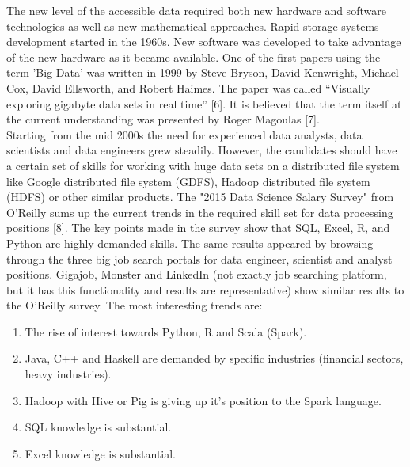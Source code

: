 \documentclass[
  twoside,
  11pt, a4paper,
  footinclude=true,
  headinclude=true,
  cleardoublepage=empty
]{scrreprt}
\begin{document}
        The new level of the accessible data required both new hardware and software technologies as well as new mathematical approaches. Rapid storage systems development started in the 1960s. New software was developed to take advantage of the new hardware as it became available. One of the first papers using the term 'Big Data' was written in 1999 by Steve Bryson, David Kenwright, Michael Cox, David Ellsworth, and Robert Haimes. The paper was called “Visually exploring gigabyte data sets in real time” [6]. It is believed that the term itself at the current understanding was presented by Roger Magoulas [7].\\
        Starting from the mid 2000s the need for experienced data analysts, data scientists and data engineers grew steadily. However, the candidates should have a certain set of skills for working with huge data sets on a distributed file system like Google distributed file system (GDFS), Hadoop distributed file system (HDFS) or other similar products. The "2015 Data Science Salary Survey" from O'Reilly sums up the current trends in the required skill set for data processing positions [8]. The key points made in the survey show that SQL, Excel, R, and Python are highly demanded skills. The same results appeared by browsing through the three big job search portals for data engineer, scientist and analyst positions. Gigajob, Monster and LinkedIn (not exactly job searching  platform, but it has this functionality and results are representative) show similar results to the O'Reilly survey. The most interesting trends are:
        \begin{enumerate}
            \item The rise of interest towards Python, R and Scala (Spark).
            \item Java, C++ and Haskell are demanded by specific industries (financial sectors, heavy industries).
            \item Hadoop with Hive or Pig is giving up it's position to the Spark language.
            \item SQL knowledge is substantial.
            \item Excel knowledge is substantial.
        \end{enumerate}
\end{document}
